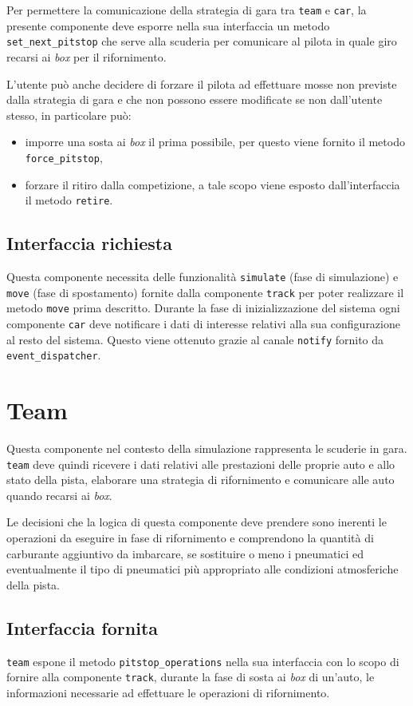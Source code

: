 \documentclass[a4paper]{report}
\newcommand{\fun}[1]{\texttt{#1}}
\begin{document}
Per permettere la comunicazione della strategia di gara tra \texttt{team} e \texttt{car}, la presente componente deve esporre nella sua interfaccia un metodo \fun{set\_next\_pitstop} che serve alla scuderia per comunicare al pilota in quale giro recarsi ai \textit{box} per il rifornimento.

L'utente può anche decidere di forzare il pilota ad effettuare mosse non previste dalla strategia di gara e che non possono essere modificate se non dall'utente stesso, in particolare può:
\begin{itemize}
\item imporre una sosta ai \textit{box} il prima possibile, per questo viene fornito il metodo \fun{force\_pitstop},
\item forzare il ritiro dalla competizione, a tale scopo viene esposto dall'interfaccia il metodo \fun{retire}.
\end{itemize}

\subsection*{Interfaccia richiesta}
Questa componente necessita delle funzionalità \fun{simulate} (fase di simulazione) e \fun{move} (fase di spostamento) fornite dalla componente \texttt{track} per poter realizzare il metodo \fun{move} prima descritto.
Durante la fase di inizializzazione del sistema ogni componente \texttt{car} deve notificare i dati di interesse relativi alla sua configurazione al resto del sistema. Questo viene ottenuto grazie al canale \fun{notify} fornito da \texttt{event\_dispatcher}.

\section{Team}
Questa componente nel contesto della simulazione rappresenta le scuderie in gara. \texttt{team} deve quindi ricevere i dati relativi alle prestazioni delle proprie auto e allo stato della pista, elaborare una strategia di rifornimento e comunicare alle auto quando recarsi ai \textit{box}.

Le decisioni che la logica di questa componente deve prendere sono inerenti le operazioni da eseguire in fase di rifornimento e comprendono la quantità di carburante aggiuntivo da imbarcare, se sostituire o meno i pneumatici ed eventualmente il tipo di pneumatici più appropriato alle condizioni atmosferiche della pista.

\subsection*{Interfaccia fornita}
\texttt{team} espone il metodo \fun{pitstop\_operations} nella sua interfaccia con lo scopo di fornire alla componente \texttt{track}, durante la fase di sosta ai \textit{box} di un'auto, le informazioni necessarie ad effettuare le operazioni di rifornimento.
\end{document}
